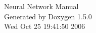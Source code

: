 \documentclass[a4paper]{book}
\begin{document}
\begin{titlepage}
\vspace*{7cm}
\begin{center}
{\Large Neural Network Manual}\\
\vspace*{1cm}
{\large Generated by Doxygen 1.5.0}\\
\vspace*{0.5cm}
{\small Wed Oct 25 19:41:50 2006}\\
\end{center}
\end{titlepage}
\clearemptydoublepage


\tableofcontents
\clearemptydoublepage





\printindex
\end{document}
